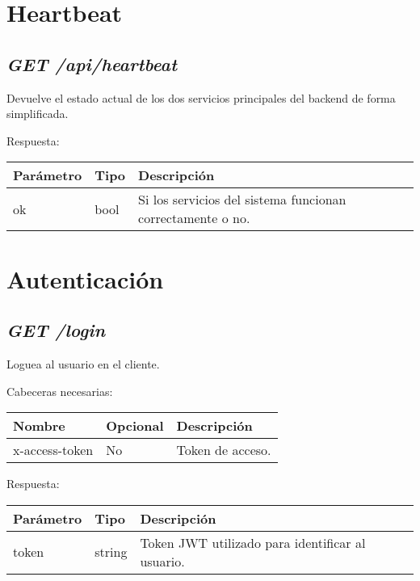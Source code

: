 \section{Heartbeat}

\subsection{\textit{GET /api/heartbeat}}

Devuelve el estado actual de los dos servicios principales del backend de forma simplificada.

Respuesta:
\begin{table}[h!]
	\centering
\begin{adjustbox}{max width=\textwidth}
	\begin{tabularx}{\linewidth}{|l|l|L|}
		\hline
		Parámetro & Tipo & Descripción \\ \hline
		ok & bool & Si los servicios del sistema funcionan correctamente o no. \\ \hline
	\end{tabularx}
\end{adjustbox}
\end{table}










\section{Autenticación}

\subsection{\textit{GET /login}}
Loguea al usuario en el cliente.

Cabeceras necesarias:
\begin{table}[h!]
	\centering
	\begin{adjustbox}{max width=\textwidth}
	\begin{tabular}{|l|l|l|}
		\hline
		Nombre & Opcional & Descripción \\ \hline
		x-access-token & No & Token de acceso. \\ \hline
	\end{tabular}
\end{adjustbox}
\end{table}


Respuesta:
\begin{table}[h!]
	\centering
	\begin{adjustbox}{max width=\textwidth}
	\begin{tabular}{|l|l|l|}
		\hline
		Parámetro & Tipo & Descripción \\ \hline
		token & string & Token JWT utilizado para identificar al usuario. \\ \hline
	\end{tabular}
\end{adjustbox}
\end{table}


